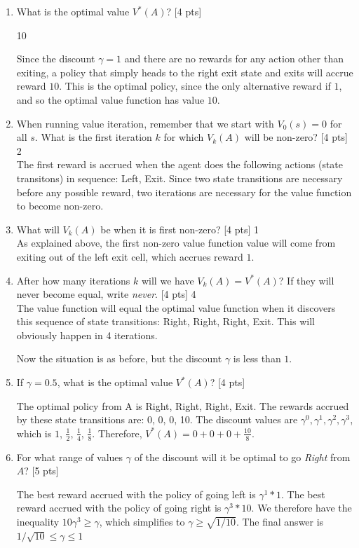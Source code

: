 \begin{enumerate}
\item What is the optimal value $V^*(A)$? [4 pts] 
{ \color{red}
10

Since the discount $\gamma=1$ and there are no rewards for any action other than exiting, a policy that simply heads to the right exit state and exits will accrue reward $10$.
This is the optimal policy, since the only alternative reward if $1$, and so the optimal value function has value $10$.
}


\vfill
\item When running value iteration, remember that we start with $V_0(s)=0$ for all $s$.
What is the first iteration $k$ for which $V_k(A)$ will be non-zero? [4 pts]
{\color{red}
2\\
The first reward is accrued when the agent does the following actions (state transitons) in sequence: Left, Exit.
Since two state transitions are necessary before any possible reward, two iterations are necessary for the value function to become non-zero.
}

\vfill

\item What will $V_k(A)$ be when it is first non-zero? [4 pts]
{ \color{red}
1\\
As explained above, the first non-zero value function value will come from exiting out of the left exit cell, which accrues reward $1$.}

\vfill

\item After how many iterations $k$ will we have $V_k(A) = V^*(A)$?  If they will never become equal, write \emph{never}. [4 pts]
{ \color{red}
4\\
The value function will equal the optimal value function when it discovers this sequence of state transitions: Right, Right, Right, Exit.
This will obviously happen in 4 iterations.
}

\vfill

\newpage
Now the situation is as before, but the discount $\gamma$ is less than $1$.
\item If $\gamma = 0.5$, what is the optimal value $V^*(A)$? [4 pts]

{ \color{red}
The optimal policy from A is Right, Right, Right, Exit.
The rewards accrued by these state transitions are: 0, 0, 0, 10.
The discount values are $\gamma^0, \gamma^1, \gamma^2, \gamma^3$, which is $1$, $\frac{1}{2}$, $\frac{1}{4}$, $\frac{1}{8}$.
Therefore, $V^*(A) = 0 + 0 + 0 + \frac{10}{8}$.
}

\vfill

\item For what range of values $\gamma$ of the discount will it be optimal to go \emph{Right} from $A$? [5 pts]

{\color{red}
The best reward accrued with the policy of going left is $\gamma^1 * 1$.
The best reward accrued with the policy of going right is $\gamma^3 * 10$.
We therefore have the inequality $10 \gamma^3 \geq \gamma$, which simplifies to $\gamma \geq \sqrt{1/10}$.
The final answer is $1/\sqrt{10} \le \gamma \le 1$
}

\vfill

\end{enumerate}
